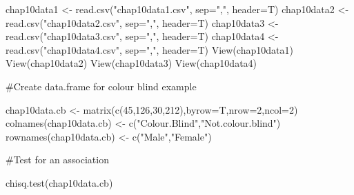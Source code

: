 \documentclass[
  letterpaper,
  DIV=11,
  numbers=noendperiod]{scrartcl}
\newenvironment{Shaded}{\begin{snugshade}}{\end{snugshade}}
\newcommand{\AttributeTok}[1]{\textcolor[rgb]{0.40,0.45,0.13}{#1}}
\newcommand{\DecValTok}[1]{\textcolor[rgb]{0.68,0.00,0.00}{#1}}
\newcommand{\FunctionTok}[1]{\textcolor[rgb]{0.28,0.35,0.67}{#1}}
\newcommand{\NormalTok}[1]{\textcolor[rgb]{0.00,0.23,0.31}{#1}}
\newcommand{\OtherTok}[1]{\textcolor[rgb]{0.00,0.23,0.31}{#1}}
\newcommand{\StringTok}[1]{\textcolor[rgb]{0.13,0.47,0.30}{#1}}
\begin{document}
\begin{Shaded}
\begin{Highlighting}[]
\NormalTok{chap10data1 }\OtherTok{\textless{}{-}} \FunctionTok{read.csv}\NormalTok{(}\StringTok{"chap10data1.csv"}\NormalTok{, }\AttributeTok{sep=}\StringTok{","}\NormalTok{, }\AttributeTok{header=}\NormalTok{T)}
\NormalTok{chap10data2 }\OtherTok{\textless{}{-}} \FunctionTok{read.csv}\NormalTok{(}\StringTok{"chap10data2.csv"}\NormalTok{, }\AttributeTok{sep=}\StringTok{","}\NormalTok{, }\AttributeTok{header=}\NormalTok{T)}
\NormalTok{chap10data3 }\OtherTok{\textless{}{-}} \FunctionTok{read.csv}\NormalTok{(}\StringTok{"chap10data3.csv"}\NormalTok{, }\AttributeTok{sep=}\StringTok{","}\NormalTok{, }\AttributeTok{header=}\NormalTok{T)}
\NormalTok{chap10data4 }\OtherTok{\textless{}{-}} \FunctionTok{read.csv}\NormalTok{(}\StringTok{"chap10data4.csv"}\NormalTok{, }\AttributeTok{sep=}\StringTok{","}\NormalTok{, }\AttributeTok{header=}\NormalTok{T)}
\FunctionTok{View}\NormalTok{(chap10data1)}
\FunctionTok{View}\NormalTok{(chap10data2)}
\FunctionTok{View}\NormalTok{(chap10data3)}
\FunctionTok{View}\NormalTok{(chap10data4)}
\end{Highlighting}
\end{Shaded}

\#Create data.frame for colour blind example

\begin{Shaded}
\begin{Highlighting}[]
\NormalTok{chap10data.cb }\OtherTok{\textless{}{-}} \FunctionTok{matrix}\NormalTok{(}\FunctionTok{c}\NormalTok{(}\DecValTok{45}\NormalTok{,}\DecValTok{126}\NormalTok{,}\DecValTok{30}\NormalTok{,}\DecValTok{212}\NormalTok{),}\AttributeTok{byrow=}\NormalTok{T,}\AttributeTok{nrow=}\DecValTok{2}\NormalTok{,}\AttributeTok{ncol=}\DecValTok{2}\NormalTok{)}
\FunctionTok{colnames}\NormalTok{(chap10data.cb) }\OtherTok{\textless{}{-}} \FunctionTok{c}\NormalTok{(}\StringTok{"Colour.Blind"}\NormalTok{,}\StringTok{"Not.colour.blind"}\NormalTok{)}
\FunctionTok{rownames}\NormalTok{(chap10data.cb) }\OtherTok{\textless{}{-}} \FunctionTok{c}\NormalTok{(}\StringTok{"Male"}\NormalTok{,}\StringTok{"Female"}\NormalTok{)}
\end{Highlighting}
\end{Shaded}

\#Test for an association

\begin{Shaded}
\begin{Highlighting}[]
\FunctionTok{chisq.test}\NormalTok{(chap10data.cb)}
\end{Highlighting}
\end{Shaded}
\end{document}
